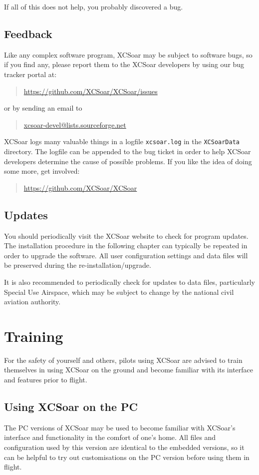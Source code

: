 If all of this does not help, you probably discovered a bug.

\subsection*{Feedback}
Like any complex software program, XCSoar may be subject to software
bugs, so if you find any, please report them to the XCSoar developers
by using our bug tracker portal at: 
\begin{quote}
\url{https://github.com/XCSoar/XCSoar/issues}
\end{quote}
or by sending an email to
\begin{quote}
\href{mailto:xcsoar-devel@lists.sourceforge.net}{xcsoar-devel@lists.sourceforge.net}
\end{quote}
XCSoar logs many valuable things in a logfile
\verb|xcsoar.log| in the \texttt{XCSoarData} directory. The logfile can be appended to the bug ticket in order to help XCSoar developers determine the cause of possible problems.
If you like the idea of doing some more, get involved:
\begin{quote}
\url{https://github.com/XCSoar/XCSoar}
\end{quote}

\subsection*{Updates}
You should periodically visit the XCSoar website to check for program
updates. The installation procedure in the following chapter can typically be
repeated in order to upgrade the software.  All user configuration
settings and data files will be preserved during the
re-installation/upgrade.

It is also recommended to periodically check for updates to data
files, particularly Special Use Airspace, which may be subject to
change by the national civil aviation authority.

\section{Training}
For the safety of yourself and others, pilots using XCSoar are advised to
train themselves in using XCSoar on the ground and become familiar with its
interface and features prior to flight.

\subsection*{Using XCSoar on the PC}
The PC versions of XCSoar may be used to become familiar with XCSoar's
interface and functionality in the comfort of one's home.  All files
and configuration used by this version are identical to the embedded versions,
so it can be helpful to try out customisations on the PC version before using
them in flight.

